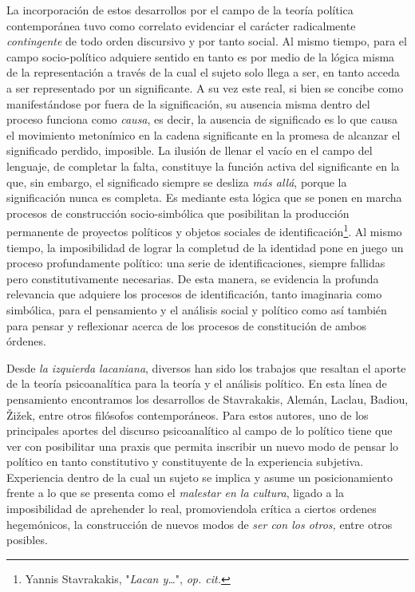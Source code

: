 La incorporación de estos desarrollos por el campo de la teoría política
contemporánea tuvo como correlato evidenciar el carácter radicalmente
\emph{contingente} de todo orden discursivo y por tanto social. Al mismo
tiempo, para el campo socio-político adquiere sentido en tanto es por
medio de la lógica misma de la representación a través de la cual el
sujeto solo llega a ser, en tanto acceda a ser representado por un
significante. A su vez este real, si bien se concibe como manifestándose
por fuera de la significación, su ausencia misma dentro del proceso
funciona como \emph{causa}, es decir, la ausencia de significado es lo
que causa el movimiento metonímico en la cadena significante en la
promesa de alcanzar el significado perdido, imposible. La ilusión de
llenar el vacío en el campo del lenguaje, de completar la falta,
constituye la función activa del significante en la que, sin embargo, el
significado siempre se desliza \emph{más allá}, porque la significación
nunca es completa. Es mediante esta lógica que se ponen en marcha
procesos de construcción socio-simbólica que posibilitan la producción
permanente de proyectos políticos y objetos sociales de
identificación\footnote{Yannis Stavrakakis, "\emph{Lacan y\ldots{}}",
  \emph{op. cit.}}. Al mismo tiempo, la imposibilidad de lograr la
completud de la identidad pone en juego un proceso profundamente
político: una serie de identificaciones, siempre fallidas pero
constitutivamente necesarias. De esta manera, se evidencia la profunda
relevancia que adquiere los procesos de identificación, tanto imaginaria
como simbólica, para el pensamiento y el análisis social y político como
así también para pensar y reflexionar acerca de los procesos de
constitución de ambos órdenes.

Desde \emph{la izquierda lacaniana}, diversos han sido los trabajos que
resaltan el aporte de la teoría psicoanalítica para la teoría y el
análisis político. En esta línea de pensamiento encontramos los
desarrollos de Stavrakakis, Alemán, Laclau, Badiou, Žižek, entre otros
filósofos contemporáneos. Para estos autores, uno de los principales
aportes del discurso psicoanalítico al campo de lo político tiene que
ver con posibilitar una praxis que permita inscribir un nuevo modo de
pensar lo político en tanto constitutivo y constituyente de la
experiencia subjetiva. Experiencia dentro de la cual un sujeto se
implica y asume un posicionamiento frente a lo que se presenta como el
\emph{malestar en la cultura}, ligado a la imposibilidad de aprehender
lo real, promoviendola crítica a ciertos ordenes hegemónicos, la
construcción de nuevos modos de \emph{ser con los otros,} entre otros
posibles.

